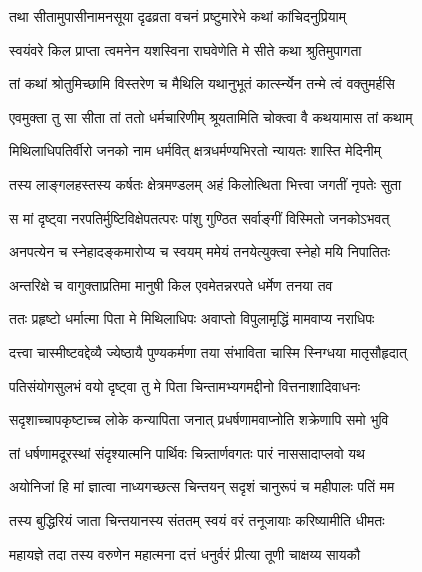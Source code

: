 \twolineshloka
{तथा सीतामुपासीनामनसूया दृढव्रता}
{वचनं प्रष्टुमारेभे कथां कांचिदनुप्रियाम्} %

\twolineshloka
{स्वयंवरे किल प्राप्ता त्वमनेन यशस्विना}
{राघवेणेति मे सीते कथा श्रुतिमुपागता} %

\twolineshloka
{तां कथां श्रोतुमिच्छामि विस्तरेण च मैथिलि}
{यथानुभूतं कार्त्स्न्येन तन्मे त्वं वक्तुमर्हसि} %

\twolineshloka
{एवमुक्ता तु सा सीता तां ततो धर्मचारिणीम्}
{श्रूयतामिति चोक्त्वा वै कथयामास तां कथाम्} %

\twolineshloka
{मिथिलाधिपतिर्वीरो जनको नाम धर्मवित्}
{क्षत्रधर्मण्यभिरतो न्यायतः शास्ति मेदिनीम्} %

\twolineshloka
{तस्य लाङ्गलहस्तस्य कर्षतः क्षेत्रमण्डलम्}
{अहं किलोत्थिता भित्त्वा जगतीं नृपतेः सुता} %

\twolineshloka
{स मां दृष्ट्वा नरपतिर्मुष्टिविक्षेपतत्परः}
{पांशु गुण्ठित सर्वाङ्गीं विस्मितो जनकोऽभवत्} %

\twolineshloka
{अनपत्येन च स्नेहादङ्कमारोप्य च स्वयम्}
{ममेयं तनयेत्युक्त्वा स्नेहो मयि निपातितः} %

\twolineshloka
{अन्तरिक्षे च वागुक्ताप्रतिमा मानुषी किल}
{एवमेतन्नरपते धर्मेण तनया तव} %

\twolineshloka
{ततः प्रहृष्टो धर्मात्मा पिता मे मिथिलाधिपः}
{अवाप्तो विपुलामृद्धिं मामवाप्य नराधिपः} %

\twolineshloka
{दत्त्वा चास्मीष्टवद्देव्यै ज्येष्ठायै पुण्यकर्मणा}
{तया संभाविता चास्मि स्निग्धया मातृसौहृदात्} %

\twolineshloka
{पतिसंयोगसुलभं वयो दृष्ट्वा तु मे पिता}
{चिन्तामभ्यगमद्दीनो वित्तनाशादिवाधनः} %

\twolineshloka
{सदृशाच्चापकृष्टाच्च लोके कन्यापिता जनात्}
{प्रधर्षणामवाप्नोति शक्रेणापि समो भुवि} %

\twolineshloka
{तां धर्षणामदूरस्थां संदृश्यात्मनि पार्थिवः}
{चिन्न्तार्णवगतः पारं नाससादाप्लवो यथ} %

\twolineshloka
{अयोनिजां हि मां ज्ञात्वा नाध्यगच्छत्स चिन्तयन्}
{सदृशं चानुरूपं च महीपालः पतिं मम} %

\twolineshloka
{तस्य बुद्धिरियं जाता चिन्तयानस्य संततम्}
{स्वयं वरं तनूजायाः करिष्यामीति धीमतः} %

\twolineshloka
{महायज्ञे तदा तस्य वरुणेन महात्मना}
{दत्तं धनुर्वरं प्रीत्या तूणी चाक्षय्य सायकौ} %

